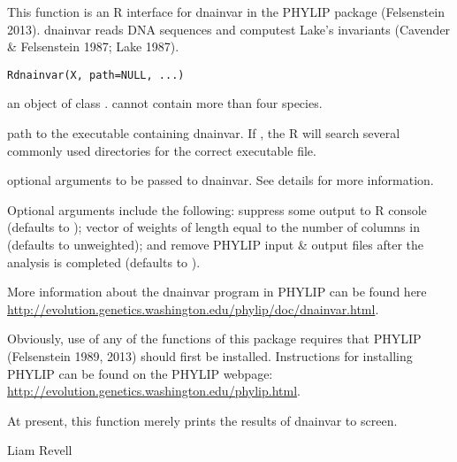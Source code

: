 \documentclass[a4paper]{book}
\begin{document}
%
\begin{Description}\relax
This function is an R interface for dnainvar in the PHYLIP package (Felsenstein 2013). dnainvar reads DNA sequences and computest Lake's invariants (Cavender \& Felsenstein 1987; Lake 1987).
\end{Description}
%
\begin{Usage}
\begin{verbatim}
Rdnainvar(X, path=NULL, ...)
\end{verbatim}
\end{Usage}
%
\begin{Arguments}
\begin{ldescription}
\item[\code{X}] an object of class .  cannot contain more than four species.
\item[\code{path}] path to the executable containing dnainvar. If , the R will search several commonly used directories for the correct executable file.
\item[\code{...}] optional arguments to be passed to dnainvar. See details for more information.
\end{ldescription}
\end{Arguments}
%
\begin{Details}\relax
Optional arguments include the following:  suppress some output to R console (defaults to );  vector of weights of length equal to the number of columns in  (defaults to unweighted); and  remove PHYLIP input \& output files after the analysis is completed (defaults to ).

More information about the dnainvar program in PHYLIP can be found here \url{http://evolution.genetics.washington.edu/phylip/doc/dnainvar.html}.

Obviously, use of any of the functions of this package requires that PHYLIP (Felsenstein 1989, 2013) should first be installed. Instructions for installing PHYLIP can be found on the PHYLIP webpage: \url{http://evolution.genetics.washington.edu/phylip.html}.
\end{Details}
%
\begin{Value}
At present, this function merely prints the results of dnainvar to screen.
\end{Value}
%
\begin{Author}\relax
Liam Revell 
\end{Author}
\end{document}
